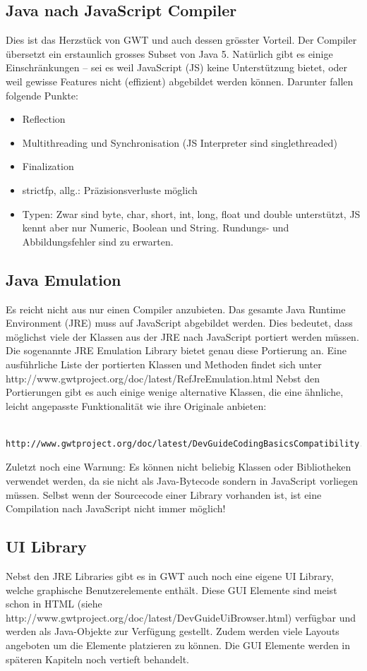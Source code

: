 \documentclass[a4paper,10pt]{scrreprt}
\begin{document}
\subsection{Java nach JavaScript Compiler}
Dies ist das Herzstück von GWT und auch dessen grösster Vorteil. Der Compiler übersetzt ein
erstaunlich grosses Subset von Java 5. Natürlich gibt es einige Einschränkungen – sei es weil
JavaScript (JS) keine Unterstützung bietet, oder weil gewisse Features nicht (effizient) abgebildet
werden können. Darunter fallen folgende Punkte:
\begin{itemize}
\item Reflection
\item Multithreading und Synchronisation
(JS Interpreter sind singlethreaded)
\item Finalization
\item strictfp, allg.: Präzisionsverluste möglich
\item Typen: Zwar sind byte, char, short, int,
long, float und double unterstützt, JS
kennt aber nur Numeric, Boolean und
String. Rundungs- und Abbildungsfehler
sind zu erwarten. 
\end{itemize}

\subsection{Java Emulation}
Es reicht nicht aus nur einen Compiler anzubieten. Das gesamte Java Runtime Environment (JRE)
muss auf JavaScript abgebildet werden. Dies bedeutet, dass möglichst viele der Klassen aus der
JRE nach JavaScript portiert werden müssen. Die sogenannte JRE Emulation Library bietet genau
diese Portierung an. Eine ausführliche Liste der portierten Klassen und Methoden findet sich
unter http://www.gwtproject.org/doc/latest/RefJreEmulation.html
Nebst den Portierungen gibt es auch einige wenige alternative Klassen, die eine ähnliche, leicht
angepasste Funktionalität wie ihre Originale anbieten:
\begin{verbatim}
 http://www.gwtproject.org/doc/latest/DevGuideCodingBasicsCompatibility.html#similar
\end{verbatim}

Zuletzt noch eine Warnung: Es können nicht beliebig Klassen oder Bibliotheken verwendet
werden, da sie nicht als Java-Bytecode sondern in JavaScript vorliegen müssen. Selbst wenn der
Sourcecode einer Library vorhanden ist, ist eine Compilation nach JavaScript nicht immer
möglich!

\subsection{UI Library}
Nebst den JRE Libraries gibt es in GWT auch noch eine eigene UI Library, welche graphische
Benutzerelemente enthält. Diese GUI Elemente sind meist schon in HTML (siehe
http://www.gwtproject.org/doc/latest/DevGuideUiBrowser.html) verfügbar und werden als
Java-Objekte zur Verfügung gestellt. Zudem werden viele Layouts angeboten um die Elemente
platzieren zu können. Die GUI Elemente werden in späteren Kapiteln noch vertieft behandelt.
\end{document}
